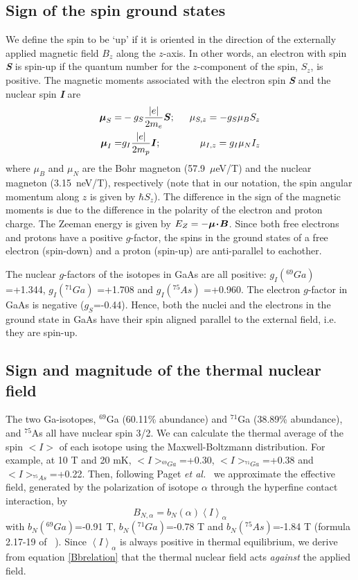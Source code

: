 \documentclass[rmp,twocolumn,aps]{revtex4}
\begin{document}
\subsection{Sign of the spin ground states}
We define the spin to be `up' if it is oriented in the direction
of the externally applied magnetic field $B_z$ along the $z$-axis.
In other words, an electron with spin \textbf{\textit{S}} is
spin-up if the quantum number for the $z$-component of the spin, $S_z$, is positive. The
magnetic moments associated with the electron spin
\textbf{\textit{S}} and the nuclear spin \textbf{\textit{I}} are
\begin{eqnarray}
     \mbox{\boldmath$\mu$}_S =& -g_S \frac{|e|}{2m_e}\mbox{\boldmath$S$};\ \  &\mu_{S,z} = -g_S \mu_B S_z\\
     \mbox{\boldmath$\mu$}_I =& g_I \frac{|e| }{2m_p}\mbox{\boldmath$I$};\ \  &\mu_{I,z} = g_I \mu_N I_z
\end{eqnarray}
where $\mu_B$ and $\mu_N$ are the Bohr magneton (57.9~$\mu$eV/T)
and the nuclear magneton (3.15~neV/T), respectively (note that in our notation, the spin angular momentum along $z$ is given by $\hbar S_z$). The difference in the 
sign of the magnetic moments is due to the difference in the
polarity of the electron and proton charge. The Zeeman energy is
given by $E_{Z}=-\mbox{\boldmath$\mu\!\cdot\! B$}$. Since both
free electrons and protons have a positive $g$-factor, the spins
in the ground states of a free electron (spin-down) and a proton
(spin-up) are anti-parallel to eachother.

The nuclear $g$-factors of the isotopes in GaAs are all positive:
$g_I(^{69}Ga)$ =+1.344, $g_I(^{71}Ga)\!$  =+1.708 and
$g_I(^{75}As)\!$ =+0.960. The electron $g$-factor in GaAs is
negative ($g_S$=-0.44). Hence, both the nuclei and the electrons
in the ground state in GaAs have their spin aligned parallel to
the external field, i.e. they are spin-up.

\subsection{Sign and magnitude of the thermal nuclear field}
The two Ga-isotopes, $^{69}$Ga (60.11\% abundance) and $^{71}$Ga
(38.89\% abundance), and $^{75}$As all have nuclear spin 3/2. We
can calculate the thermal average of the spin $<\!\!I\!\!>$ of
each isotope using the Maxwell-Boltzmann distribution. For
example, at 10 T and 20 mK, $<\!\!I\!\!>_{^{69}Ga}$=+0.30,
$<\!\!I\!\!>_{^{71}Ga}$=+0.38 and $<\!\!I\!\!>_{^{75}As}$=+0.22.
Then, following Paget \textit{et al.}~\cite{paget77} we
approximate the effective field, generated by the polarization of
isotope $\alpha$ through the hyperfine contact interaction, by
\begin{equation}
    B_{N,\alpha}=b_N(\alpha)\left\langle I\right\rangle_\alpha
    \label{Bbrelation}
\end{equation}
with $b_N(^{69}Ga)$=-0.91 T, $b_N(^{71}Ga)$=-0.78 T and $b_N(^{75}As)$=-1.84 T (formula 2.17-19 of ~\textcite{paget77}). Since $\left\langle I\right\rangle_\alpha$ is always positive in thermal equilibrium, we derive from equation \ref{Bbrelation} that the thermal nuclear field acts \textit{against} the applied field. 
\end{document}
